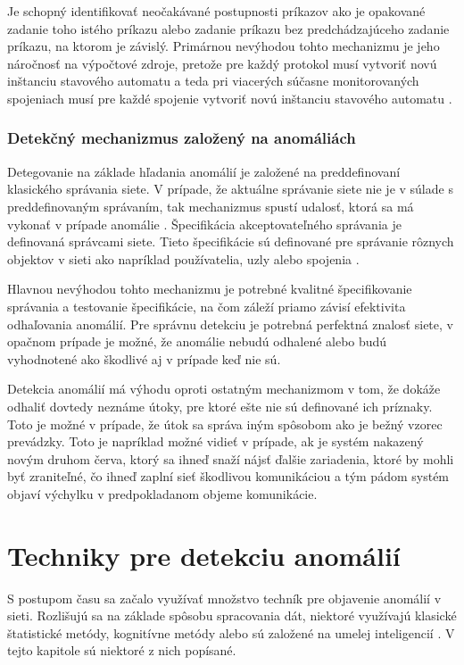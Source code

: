 Je schopný identifikovať neočakávané postupnosti príkazov ako je opakované zadanie toho istého príkazu alebo zadanie príkazu bez predchádzajúceho zadanie príkazu, na ktorom je závislý. Primárnou nevýhodou tohto mechanizmu je jeho náročnosť na výpočtové zdroje, pretože pre každý protokol musí vytvoriť novú inštanciu stavového automatu a teda pri viacerých súčasne monitorovaných spojeniach musí pre každé spojenie vytvoriť novú inštanciu stavového automatu \cite{NIDS-PDF}.

\subsection*{Detekčný mechanizmus založený na anomáliách}

Detegovanie na základe hľadania anomálií je založené na preddefinovaní klasického správania siete. V prípade, že aktuálne správanie siete nie je v súlade s preddefinovaným správaním, tak mechanizmus spustí udalosť, ktorá sa má vykonať v prípade anomálie \cite{AnomalyDetection}. Špecifikácia akceptovateľného správania je definovaná správcami siete. Tieto špecifikácie sú definované pre správanie rôznych objektov v sieti ako napríklad používatelia, uzly alebo spojenia \cite{NIDS-PDF}.

Hlavnou nevýhodou tohto mechanizmu je potrebné kvalitné špecifikovanie správania a testovanie špecifikácie, na čom záleží priamo závisí efektivita odhaľovania anomálií. Pre správnu detekciu je potrebná perfektná znalosť siete, v opačnom prípade je možné, že anomálie nebudú odhalené alebo budú vyhodnotené ako škodlivé aj v prípade keď nie sú.

Detekcia anomálií má výhodu oproti ostatným mechanizmom v tom, že dokáže odhaliť dovtedy neznáme útoky, pre ktoré ešte nie sú definované ich príznaky. Toto je možné v prípade, že útok sa správa iným spôsobom ako je bežný vzorec prevádzky. Toto je napríklad možné vidieť v prípade, ak je systém nakazený novým druhom červa, ktorý sa ihneď snaží nájsť ďalšie zariadenia, ktoré by mohli byť zraniteľné, čo ihneď zaplní sieť škodlivou komunikáciou a tým pádom systém objaví výchylku v predpokladanom objeme komunikácie. 

\chapter{Techniky pre detekciu anomálií}
\label{Sec3}

S postupom času sa začalo využívať množstvo techník pre objavenie anomálií v sieti. Rozlišujú sa na základe spôsobu spracovania dát, niektoré využívajú klasické štatistické metódy, kognitívne metódy alebo sú založené na umelej inteligencií \cite{Anomaly-Clarke-Yair}. V tejto kapitole sú niektoré z nich popísané.

